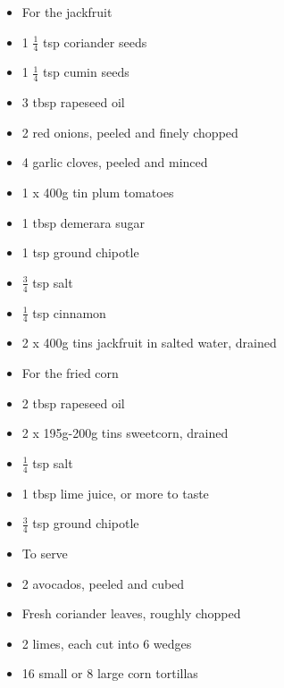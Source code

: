 \documentclass{book}
\begin{document}
\begin{itemize}
\item For the jackfruit 
\item 1 $\frac{1}{4}$ tsp coriander seeds 
\item 1 $\frac{1}{4}$ tsp cumin seeds 
\item 3 tbsp rapeseed oil 
\item 2 red onions, peeled and finely chopped 
\item 4 garlic cloves, peeled and minced 
\item 1 x 400g tin plum tomatoes 
\item 1 tbsp demerara sugar
\item 1 tsp ground chipotle 
\item $\frac{3}{4}$ tsp salt 
\item $\frac{1}{4}$ tsp cinnamon 
\item 2 x 400g tins jackfruit in salted water, drained
\end{itemize}

\begin{itemize}
\item For the fried corn
\item 2 tbsp rapeseed oil 
\item 2 x 195g-200g tins sweetcorn, drained
\item $\frac{1}{4}$ tsp salt 
\item 1 tbsp lime juice, or more to taste
\item $\frac{3}{4}$ tsp ground chipotle
\end{itemize}

\begin{itemize}
\item To serve
\item 2 avocados, peeled and cubed 
\item Fresh coriander leaves, roughly chopped
\item 2 limes, each cut into 6 wedges 
\item 16 small or 8 large corn tortillas
\end{itemize}
\end{document}
